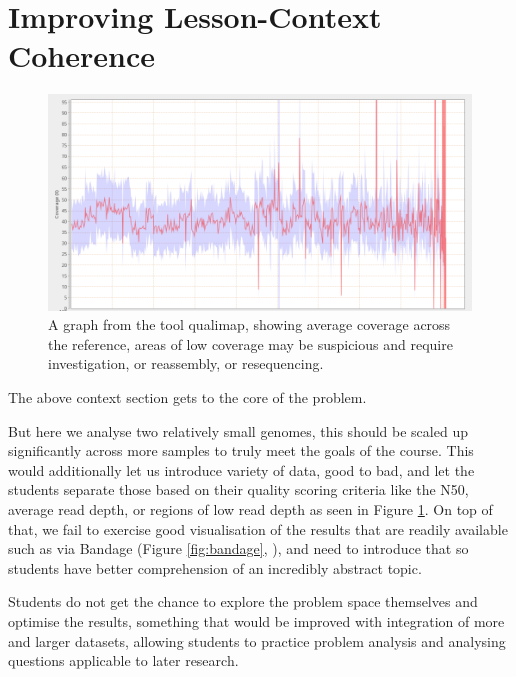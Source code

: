 \documentclass[paper=a4,justified,a4paper]{tufte-handout}
\begin{document}
\hypertarget{improving-lesson-context-coherence}{%
\section{Improving Lesson-Context
Coherence}\label{improving-lesson-context-coherence}}

\begin{figure}
\centering
\includegraphics{./coverage.png}
\caption{A graph from the tool qualimap, showing average coverage across
the reference, areas of low coverage may be suspicious and require
investigation, or reassembly, or resequencing.\label{fig:qualimap}}
\end{figure}

The above context section gets to the core of the problem.

But here we analyse two relatively small genomes, this should be scaled
up significantly across more samples to truly meet the goals of the
course. This would additionally let us introduce variety of data, good
to bad, and let the students separate those based on their quality
scoring criteria like the N50, average read depth, or regions of low
read depth as seen in Figure \ref{fig:qualimap}. On top of that, we fail
to exercise good visualisation of the results that are readily available
such as via Bandage (Figure \ref{fig:bandage},
\citep{10.1093/bioinformatics/btv383}), and need to introduce that so
students have better comprehension of an incredibly abstract topic.

Students do not get the chance to explore the problem space themselves
and optimise the results, something that would be improved with
integration of more and larger datasets, allowing students to practice
problem analysis and analysing questions applicable to later research.
\end{document}

